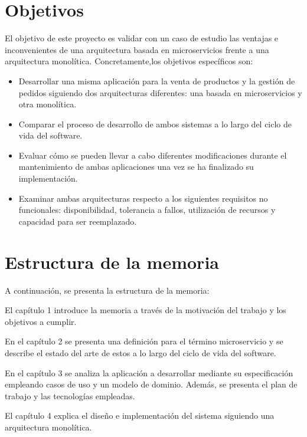 \documentclass[11pt,spanish,listoffigures]{tfgetsinf}
\begin{document}
\section{Objetivos}

El objetivo de este proyecto es validar con un caso de estudio las ventajas e inconvenientes de una arquitectura basada en microservicios frente a una arquitectura monolítica. Concretamente,los objetivos específicos son:

\begin{itemize}

\item Desarrollar una misma aplicación para la venta de productos y la gestión de pedidos siguiendo dos arquitecturas diferentes: una basada en microservicios y otra monolítica.

\item Comparar el proceso de desarrollo de ambos sistemas a lo largo del ciclo de vida del software.

\item Evaluar cómo se pueden llevar a cabo diferentes modificaciones durante el mantenimiento de ambas aplicaciones una vez se ha finalizado su implementación.

\item Examinar ambas arquitecturas respecto a los siguientes requisitos no funcionales: disponibilidad, tolerancia a fallos, utilización de recursos y capacidad para ser reemplazado.

\end{itemize}

\section{Estructura de la memoria}

A continuación, se presenta la estructura de la memoria:

El capítulo 1 introduce la memoria a través de la motivación del trabajo y los objetivos a cumplir.

En el capítulo 2 se presenta una definición para el término microservicio y se describe el estado del arte de estos a lo largo del ciclo de vida del software.

En el capítulo 3 se analiza la aplicación a desarrollar mediante su especificación   empleando casos de uso y un modelo de dominio. Además, se presenta el plan de trabajo y las tecnologías empleadas.

El capítulo 4 explica el diseño e implementación del sistema siguiendo una arquitectura monolítica.
\end{document}
